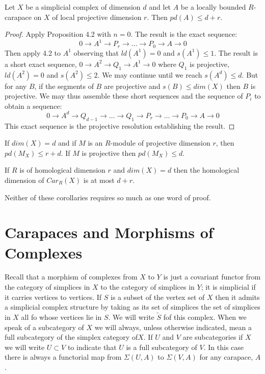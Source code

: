 \setcounter{definition}{3}
\begin{secthm}\label{chap6-thm-4.4}
Let $X$ be a simplicial complex of dimension $d$ and let $A$ be a locally bounded $R$-carapace on $X$ of local projective dimension $r$. Then $pd(A)\leq d+r$.
\end{secthm}

\begin{proof}
 Apply Proposition 4.2 with $n=0$. The result is the exact sequence:
 $$
 0 \rightarrow A^{1} \rightarrow P_{r}\rightarrow \ldots \rightarrow P_{0}\rightarrow A \rightarrow 0
 $$
 Then apply 4.2 to $A^{1}$ observing that $ld(A^{1})= 0$ and $s(A^{1})\leq 1$. The result is a short exact sequence, $0 \rightarrow A^{2} \rightarrow Q_{1} \rightarrow A^{1} \rightarrow 0$ where $Q_{1}$ is projective, $ld(A^{2})=0$ and $s(A^{2})\leq 2$. We may continue until we reach $s(A^{d})\leq d$. But for any $B$, if the segments of $B$ are projective and $s(B)\leq dim(X)$ then $B$ is projective. We may thus assemble these short sequences and the sequence of $P_{i}$ to obtain a sequence:
 $$
 0\rightarrow A^{d} \rightarrow Q_{d-1} \rightarrow \ldots \rightarrow Q_{1} \rightarrow P_{r} \rightarrow \ldots \rightarrow
 P_{0}\rightarrow A \rightarrow 0
 $$
 This exact sequence is the projective resolution establishing the result.
 \end{proof}

\begin{seccoro}\label{chap6-coro-4.5}
If $dim(X) =d$ and if $M$ is an $R$-module of projective dimension $r$, then $pd(M_{X})\leq r+d$. If $M$ is projective then $pd(M_{X}) \leq d$. 
\end{seccoro}

\begin{seccoro}\label{chap6-coro-4.6}
If $R$ is of homological dimension $r$ and $dim(X)= d$ then the homological dimension of $C ar_{R}(X)$ is at most $d+r$.
\end{seccoro}

Neither of these corollaries requires so much as one word of proof.

\section{Carapaces and Morphisms of Complexes}\label{chap6-sec-5}
Recall that a morphism of complexes from $X$ to $Y$ is just a covariant functor from the category of simplices in $X$ to the category of simplices in $Y$; it is simplicial if it carries vertices to vertices. If $S$ is a subset of the vertex set of $X$ then it admits a simplicial complex structure by taking as its set of simplices the set of simplices in $X$ all fo whose vertices lie in $S$. We will write $\tilde{S}$ fof this complex. When we speak of a subcategory of $X$ we will always, unless otherwise indicated, mean a full subcategory of the simplex category of\pageoriginale $X$. If $U$ and $V$ are subcategories if $X$  we will write $U \subset V$ to indicate that $U$ is a full subcategory of $V$. In this case there is always a functorial map from $\Sigma(U, A)$ to $\Sigma(V, A)$ for any carapace, $A$.

